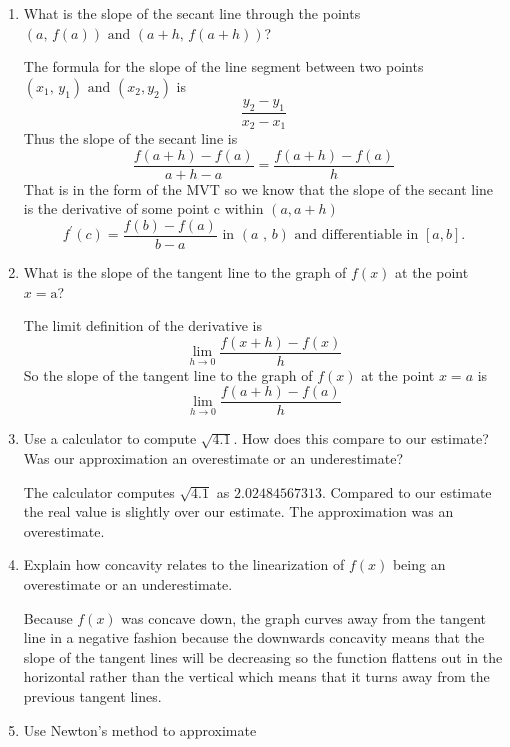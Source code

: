 \documentclass{article}
\begin{document}
\begin{enumerate}[label=\textbf{WS \arabic*}]

\item What is the slope of the secant line through the points $(a\text{, } f(a)) \text{ and } (a+h\text{, } f(a+h))$?

The formula for the slope of the line segment between two points $(x_1\text{, } y_1) \text{ and } (x_2, y_2)$ is
\[\frac{y_2-y_1}{x_2-x_1}\]
Thus the slope of the secant line is
\[\frac{f(a+h)-f(a)}{a+h-a}=\frac{f(a+h)-f(a)}{h}\]
That is in the form of the MVT so we know that the slope of the secant line is the derivative of some point c within $(a,a+h)$
\[f^\prime(c)=\frac{f(b)-f(a)}{b-a} \text{ in } (a\text{ , }b)\text{ and differentiable in } [a,b]\text{.}\]

\item What is the slope of the tangent line to the graph
of $f(x)$ at the point $x=\text{a}$?

 The limit definition of the derivative is
\[\lim_{h \to 0} {\frac{f(x+h)-f(x)}{h}}\]
So the slope of the tangent line to the graph of $f(x)$ at the point $x=a$ is
\[\lim_{h \to 0} {\frac{f(a+h)-f(a)}{h}}\]

\item Use a calculator to compute $\sqrt{4.1}$. How does this compare to our estimate? Was our approximation an overestimate or an underestimate?

The calculator computes $\sqrt{4.1}$ as $2.02484567313$. Compared to our estimate the real value is slightly over our estimate. The approximation was an overestimate.

\item Explain how concavity relates to the linearization of $f(x)$ being an overestimate or an underestimate.

Because $f(x)$ was concave down, the graph curves away from the tangent line in a negative fashion because the downwards concavity means that the slope of the tangent lines will be decreasing so the function flattens out in the horizontal rather than the vertical which means that it turns away from the previous tangent lines.

\item Use Newton's method to approximate 	

\end{enumerate}
\end{document}
